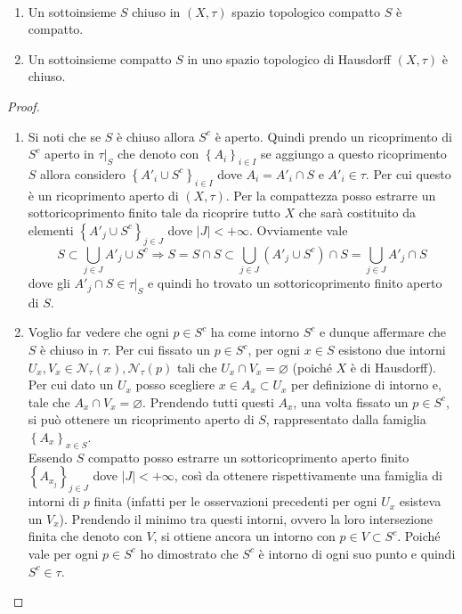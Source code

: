 \begin{theorem} \
	\begin{enumerate}
		\item Un sottoinsieme $S$ chiuso in $(X, \tau)$ spazio topologico compatto $S$ è compatto. 
		\item Un sottoinsieme compatto $S$ in uno spazio topologico di Hausdorff $(X,\tau)$ è chiuso. 
	\end{enumerate}
\end{theorem} 
\begin{proof} \
	\begin{enumerate}
		\item Si noti che se $S$ è chiuso allora $S^c$ è aperto. Quindi prendo un ricoprimento di $S^c$ aperto in $\tau|_S$ che denoto con $\left\{A_i\right\}_{i \in I}$ se aggiungo a questo ricoprimento $S$ allora considero $\left\{A'_i \cup S^c\right\}_{i \in I}$ dove $A_i = A'_i \cap S$ e $A'_i \in \tau$. Per cui questo è un ricoprimento aperto di $(X,\tau)$. Per la compattezza posso estrarre un sottoricoprimento finito tale da ricoprire tutto $X$ che sarà costituito da elementi $\left\{A'_j \cup S^c\right\}_{j \in J}$ dove $|J| < +\infty$. Ovviamente vale
		\begin{equation*}
			S \subset \bigcup_{j \in J} A'_j \cup S^c \Longrightarrow S = S \cap S \subset \bigcup_{j \in J} (A'_j \cup S^c) \cap S = \bigcup_{j \in J} A'_j  \cap S
		\end{equation*}
		dove gli $A'_j \cap S \in \tau|_S$ e quindi ho trovato un sottoricoprimento finito aperto di $S$.  
		\item 
		Voglio far vedere che ogni $p \in S^c$ ha come intorno $S^c$ e dunque affermare che $S$ è chiuso in $\tau$. Per cui fissato un $p \in S^c$, per ogni $x \in S$ esistono due intorni $U_x, V_x \in \mathcal{N}_\tau(x), \mathcal{N}_\tau(p)$ tali che $U_x \cap V_x = \varnothing$ (poiché $X$ è di Hausdorff). Per cui dato un $U_x$ posso scegliere $x \in A_x \subset U_x$ per definizione di intorno e, tale che $A_x \cap V_x = \varnothing$. Prendendo tutti questi $A_x$, una volta fissato un $p \in S^c$, si può ottenere un ricoprimento aperto di $S$, rappresentato dalla famiglia $\left\{A_x\right\}_{x \in S}$. \\ Essendo $S$ compatto posso estrarre un sottoricoprimento aperto finito  $\left\{A_{x_j}\right\}_{j \in J}$ dove $|J| < +\infty$, così da ottenere rispettivamente una famiglia di intorni di $p$ finita (infatti per le osservazioni precedenti per ogni $U_x$ esisteva un $V_x$). Prendendo il minimo tra questi intorni, ovvero la loro intersezione finita che denoto con $V$, si ottiene ancora un intorno con $p \in V \subset S^c$. Poiché vale per ogni $p \in S^c$ ho dimostrato che $S^c$ è intorno di ogni suo punto e quindi $S^c \in \tau$. 
	\end{enumerate}
\end{proof}

